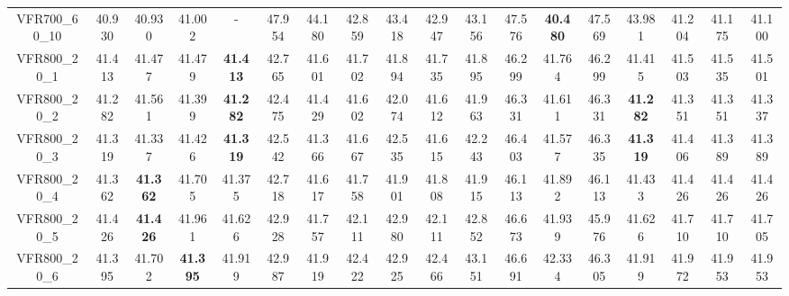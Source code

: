 \begin{tabular}{cc|ccc|ccccccccccccc}
VFR700\_60\_10     & 40.930           & 40.930           & 41.002           & -                & 47.954           & 44.180           & 42.859           & 43.418           & 42.947           & 43.156           & 47.576           & {\bf 40.480}     & 47.569           & 43.981           & 41.204           & 41.175           & 41.100          \\ 
VFR800\_20\_1      & 41.413           & 41.477           & 41.479           & {\bf 41.413}     & 42.765           & 41.601           & 41.702           & 41.894           & 41.735           & 41.895           & 46.299           & 41.764           & 46.299           & 41.415           & 41.503           & 41.535           & 41.501          \\ 
VFR800\_20\_2      & 41.282           & 41.561           & 41.399           & {\bf 41.282}     & 42.475           & 41.429           & 41.602           & 42.074           & 41.612           & 41.963           & 46.331           & 41.611           & 46.331           & {\bf 41.282}     & 41.351           & 41.351           & 41.337          \\ 
VFR800\_20\_3      & 41.319           & 41.337           & 41.426           & {\bf 41.319}     & 42.542           & 41.366           & 41.667           & 42.535           & 41.615           & 42.243           & 46.403           & 41.577           & 46.335           & {\bf 41.319}     & 41.406           & 41.389           & 41.389          \\ 
VFR800\_20\_4      & 41.362           & {\bf 41.362}     & 41.705           & 41.375           & 42.718           & 41.617           & 41.758           & 41.901           & 41.808           & 41.915           & 46.113           & 41.892           & 46.113           & 41.433           & 41.426           & 41.426           & 41.426          \\ 
VFR800\_20\_5      & 41.426           & {\bf 41.426}     & 41.961           & 41.626           & 42.928           & 41.757           & 42.111           & 42.980           & 42.111           & 42.852           & 46.673           & 41.939           & 45.976           & 41.626           & 41.710           & 41.710           & 41.705          \\ 
VFR800\_20\_6      & 41.395           & 41.702           & {\bf 41.395}     & 41.919           & 42.987           & 41.919           & 42.422           & 42.925           & 42.466           & 43.151           & 46.691           & 42.334           & 46.305           & 41.919           & 41.972           & 41.953           & 41.953          \\ 

\end{tabular}
